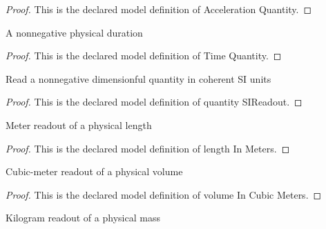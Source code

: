 \begin{proof}
  This is the declared model definition of Acceleration Quantity.
\end{proof}
\begin{definition}
  \label{def:physics:phyx-mini-0238:phyxminiproblems-problemphyxmini0238-timequantity}
  A nonnegative physical duration
\end{definition}
\begin{proof}
  This is the declared model definition of Time Quantity.
\end{proof}
\begin{definition}
  \label{def:physics:phyx-mini-0238:phyxminiproblems-problemphyxmini0238-quantitysireadout}
  Read a nonnegative dimensionful quantity in coherent SI units
\end{definition}
\begin{proof}
  This is the declared model definition of quantity SIReadout.
\end{proof}
\begin{definition}
  \label{def:physics:phyx-mini-0238:phyxminiproblems-problemphyxmini0238-lengthinmeters}
  Meter readout of a physical length
\end{definition}
\begin{proof}
  This is the declared model definition of length In Meters.
\end{proof}
\begin{definition}
  \label{def:physics:phyx-mini-0238:phyxminiproblems-problemphyxmini0238-volumeincubicmeters}
  Cubic-meter readout of a physical volume
\end{definition}
\begin{proof}
  This is the declared model definition of volume In Cubic Meters.
\end{proof}
\begin{definition}
  \label{def:physics:phyx-mini-0238:phyxminiproblems-problemphyxmini0238-massinkilograms}
  Kilogram readout of a physical mass
\end{definition}
